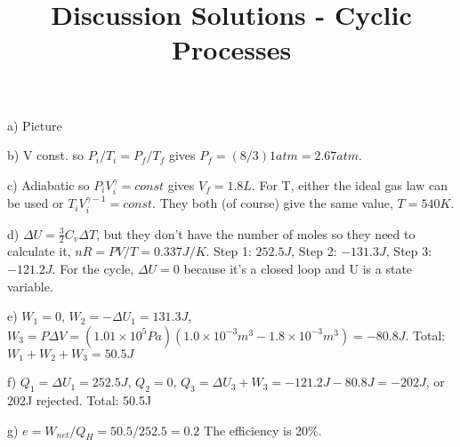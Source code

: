 \documentclass[10pt]{article}
\newenvironment{problem}[2][Problem]{\begin{trivlist}
\item[\hskip \labelsep {\bfseries #1}\hskip \labelsep {\bfseries #2.}]}{\end{trivlist}}
\begin{document}
 \title{Discussion Solutions - Cyclic Processes}
\date{}
\maketitle

\begin{problem}{1}
\item a) Picture
\item b) V const. so $P_i/T_i = P_f/T_f$ gives $P_f = (8/3) 1atm = 2.67atm$.
\item c) Adiabatic so $P_iV_i^\gamma = const$ gives $V_f=1.8L$. For T, either the ideal gas law can be used or $T_iV_i^{\gamma-1} = const$. They both (of course) give the same value, $T=540K$.
\item d) $\Delta U = \frac{3}{2}C_v\Delta T$, but they don't have the number of moles so they need to calculate it, $nR=PV/T=0.337J/K$. Step 1: $252.5J$, Step 2: $-131.3J$, Step 3: $-121.2J$. For the cycle, $\Delta U=0$ because it's a closed loop and U is a state variable.

\item e) $W_1 = 0$, $W_2 = -\Delta U_1 = 131.3J$, $W_3 = P\Delta V = (1.01\times 10^5Pa)(1.0\times10^{-3}m^3-1.8\times10^{-3}m^3) = -80.8J$. Total: $W_1+W_2+W_3 = 50.5J$
\item f) $Q_1 = \Delta U_1 = 252.5J$, $Q_2 = 0$, $Q_3 = \Delta U_3 + W_3 = -121.2J - 80.8J = -202J$, or 202J rejected. Total: 50.5J
\item g) $e=W_{net}/Q_H = 50.5 / 252.5 = 0.2$ The efficiency is 20\%.
\end{problem}








\end{document}
